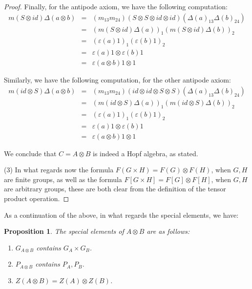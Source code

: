 \documentclass[12pt]{amsbook}
\newtheorem{proposition}[theorem]{Proposition}
\begin{document}
\begin{proof}
Finally, for the antipode axiom, we have the following computation:
\begin{eqnarray*}
m(S\otimes id)\Delta(a\otimes b)
&=&(m_{13}m_{24})(S\otimes S\otimes id\otimes id)(\Delta(a)_{13}\Delta(b)_{24})\\
&=&(m(S\otimes id)\Delta(a))_1(m(S\otimes id)\Delta(b))_2\\
&=&(\varepsilon(a)1)_1(\varepsilon(b)1)_2\\
&=&\varepsilon(a)1\otimes\varepsilon(b)1\\
&=&\varepsilon(a\otimes b)1\otimes1
\end{eqnarray*}

Similarly, we have the following computation, for the other antipode axiom:
\begin{eqnarray*}
m(id\otimes S)\Delta(a\otimes b)
&=&(m_{13}m_{24})(id\otimes id\otimes S\otimes S)(\Delta(a)_{13}\Delta(b)_{24})\\
&=&(m(id\otimes S)\Delta(a))_1(m(id\otimes S)\Delta(b))_2\\
&=&(\varepsilon(a)1)_1(\varepsilon(b)1)_2\\
&=&\varepsilon(a)1\otimes\varepsilon(b)1\\
&=&\varepsilon(a\otimes b)1\otimes1
\end{eqnarray*}

We conclude that $C=A\otimes B$ is indeed a Hopf algebra, as stated.

\medskip

(3) In what regards now the formula $F(G\times H)=F(G)\otimes F(H)$, when $G,H$ are finite groups, as well as the formula $F[G\times H]=F[G]\otimes F[H]$, when $G,H$ are arbitrary groups, these are both clear from the definition of the tensor product operation.
\end{proof}

As a continuation of the above, in what regards the special elements, we have:

\begin{proposition}
The special elements of $A\otimes B$ are as follows:
\begin{enumerate}
\item $G_{A\otimes B}$ contains $G_A\times G_B$.

\item $P_{A\otimes B}$ contains $P_A,P_B$.

\item $Z(A\otimes B)=Z(A)\otimes Z(B)$.
\end{enumerate}
\end{proposition}
\end{document}
